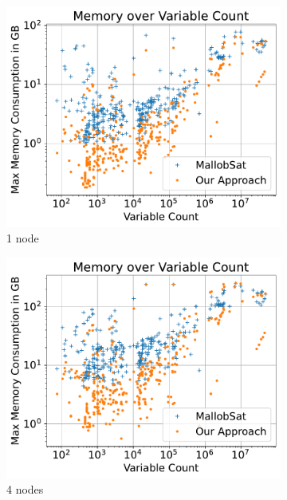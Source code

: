 \documentclass[12pt,a4paper,twoside]{scrartcl}
\numberwithin{equation}{section}
\begin{document}
\begin{figure}[!h]
  \center
  \begin{subfigure}[c]{.45\textwidth}
    \center
    \includegraphics[scale=.45]{plots/1node_compare/mem_abs_over_vars.pdf}
    \caption{1 node}
  \end{subfigure}
  \begin{subfigure}[c]{.45\textwidth}
    \center
    \includegraphics[scale=.45]{plots/4node_compare/mem_abs_over_vars.pdf}
    \caption{4 nodes}
  \end{subfigure}
  \begin{subfigure}[c]{.45\textwidth}

\end{subfigure}
\end{figure}
\end{document}
